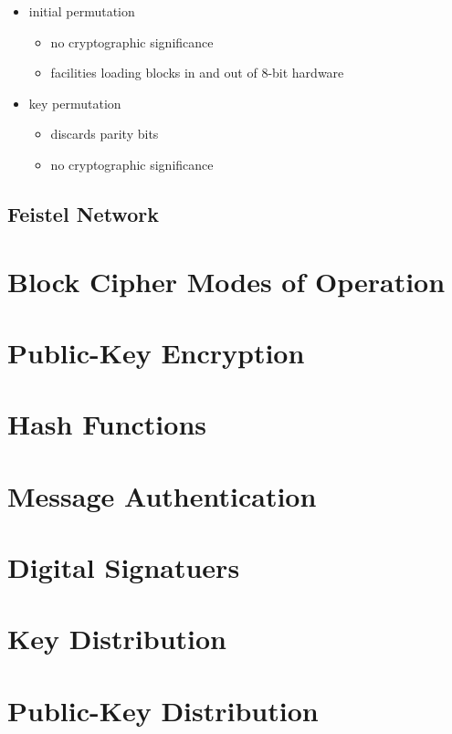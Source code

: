 \documentclass[draft]{article}
\begin{document}
\begin{itemize}[nosep]
    \item initial permutation
          \begin{itemize}[nosep]
              \item no cryptographic significance
              \item facilities loading blocks in and out of 8-bit hardware
          \end{itemize}
    \item key permutation
          \begin{itemize}[nosep]
              \item discards parity bits
              \item no cryptographic significance
          \end{itemize}
\end{itemize}
\subsection{Feistel Network}
\section{Block Cipher Modes of Operation}
\section{Public-Key Encryption}
\section{Hash Functions}
\section{Message Authentication}
\section{Digital Signatuers}
\section{Key Distribution}
\section{Public-Key Distribution}
\clearpage

\glsaddall
\printglossary[nonumberlist]
\printglossary[nonumberlist,type=\acronymtype]
\end{document}
